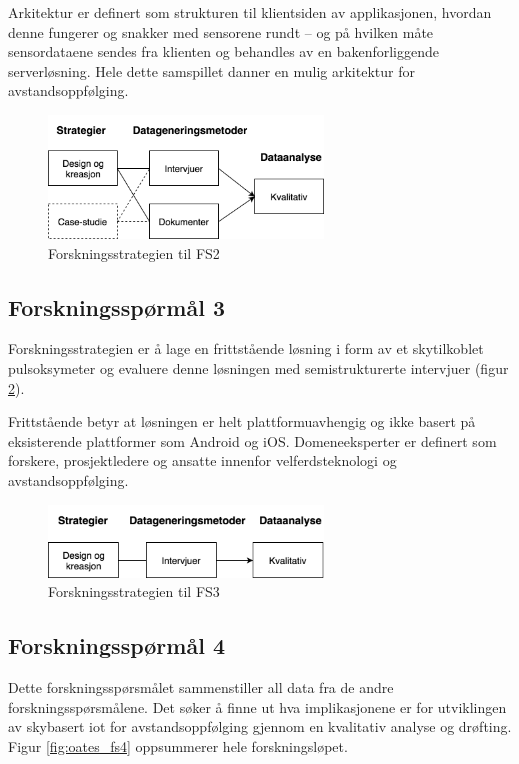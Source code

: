 Arkitektur er definert
som strukturen til klientsiden av applikasjonen, hvordan denne fungerer og snakker med sensorene rundt -- og på hvilken måte sensordataene sendes
fra klienten og behandles av en bakenforliggende serverløsning. Hele dette samspillet danner en mulig arkitektur for avstandsoppfølging.

\begin{figure}
\centering
\includegraphics[width=0.65\textwidth]{fig/oates/fs2}
\caption{Forskningsstrategien til FS2}
\label{fig:oates_fs2}
\end{figure}
    
\subsection{Forskningsspørmål 3}
\textbf{}

Forskningsstrategien er å lage en frittstående løsning i form av et skytilkoblet pulsoksymeter og evaluere
denne løsningen med semistrukturerte intervjuer (figur \ref{fig:oates_fs3}).
 
Frittstående betyr at løsningen er helt plattformuavhengig og ikke basert på eksisterende plattformer som Android og iOS.
Domeneeksperter er definert som forskere, prosjektledere og ansatte innenfor velferdsteknologi og avstandsoppfølging.

\begin{figure}
\centering
\includegraphics[width=0.65\textwidth]{fig/oates/fs3}
\caption{Forskningsstrategien til FS3}
\label{fig:oates_fs3}
\end{figure}

\subsection{Forskningsspørmål 4}
\textbf{}

Dette forskningsspørsmålet sammenstiller all data fra de andre forskningsspørsmålene. Det søker å finne ut hva implikasjonene
er for utviklingen av skybasert \gls{iot} for avstandsoppfølging gjennom en kvalitativ analyse og drøfting.
Figur \ref{fig:oates_fs4} oppsummerer hele forskningsløpet.


